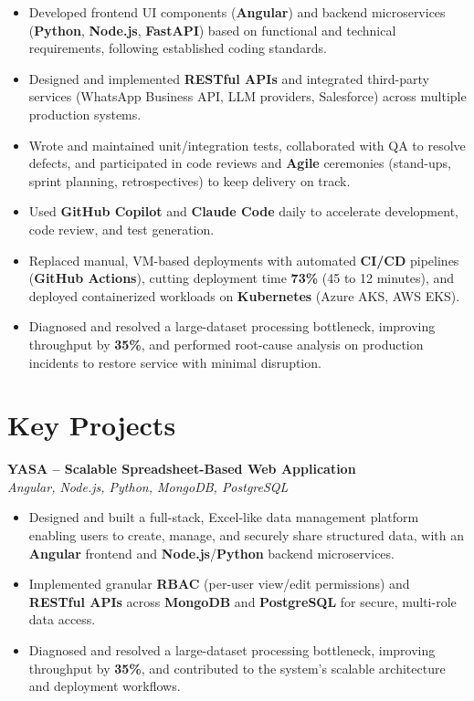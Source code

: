 \documentclass[10pt,letterpaper]{article}
\newcommand{\projtitle}[2]{\textbf{#1} \\[-1pt] \textit{#2}\\[-3pt]}
\begin{document}
\begin{itemize}
\item Developed frontend UI components (\textbf{Angular}) and backend microservices (\textbf{Python}, \textbf{Node.js}, \textbf{FastAPI}) based on functional and technical requirements, following established coding standards.
\item Designed and implemented \textbf{RESTful APIs} and integrated third-party services (WhatsApp Business API, LLM providers, Salesforce) across multiple production systems.
\item Wrote and maintained unit/integration tests, collaborated with QA to resolve defects, and participated in code reviews and \textbf{Agile} ceremonies (stand-ups, sprint planning, retrospectives) to keep delivery on track.
\item Used \textbf{GitHub Copilot} and \textbf{Claude Code} daily to accelerate development, code review, and test generation.
\item Replaced manual, VM-based deployments with automated \textbf{CI/CD} pipelines (\textbf{GitHub Actions}), cutting deployment time \textbf{73\%} (45 to 12 minutes), and deployed containerized workloads on \textbf{Kubernetes} (Azure AKS, AWS EKS).
\item Diagnosed and resolved a large-dataset processing bottleneck, improving throughput by \textbf{35\%}, and performed root-cause analysis on production incidents to restore service with minimal disruption.
\end{itemize}

\section*{Key Projects}

\projtitle{YASA -- Scalable Spreadsheet-Based Web Application}{Angular, Node.js, Python, MongoDB, PostgreSQL}
\begin{itemize}
\item Designed and built a full-stack, Excel-like data management platform enabling users to create, manage, and securely share structured data, with an \textbf{Angular} frontend and \textbf{Node.js}/\textbf{Python} backend microservices.
\item Implemented granular \textbf{RBAC} (per-user view/edit permissions) and \textbf{RESTful APIs} across \textbf{MongoDB} and \textbf{PostgreSQL} for secure, multi-role data access.
\item Diagnosed and resolved a large-dataset processing bottleneck, improving throughput by \textbf{35\%}, and contributed to the system's scalable architecture and deployment workflows.
\end{itemize}
\end{document}
